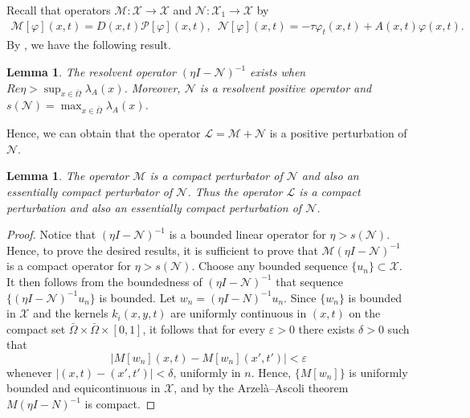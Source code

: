 \documentclass[11pt,reqno]{amsart}
\newtheorem{lemma}[theorem]{Lemma}
\numberwithin{equation}{section}
\begin{document}
Recall that operators
$\mathcal{M}: \mathcal{X}\to \mathcal{X}$ and $\mathcal{N} : \mathcal{X}_{1} \to \mathcal{X}$ by
\begin{align*}
\mathcal{M}[\varphi](x,t)= D(x,t)\mathcal{P}[\varphi](x,t),
\enspace
\mathcal{N}[\varphi](x,t)= -\tau\varphi_{t}(x,t)+A(x,t)\varphi(x,t).
\end{align*}
By \cite[Proposition 2.9]{Feng}, we have the following result.
\begin{lemma}\label{LEM2.6}
The resolvent operator $(\eta I - \mathcal{N})^{-1}$ exists when $Re \eta > \sup_{x\in\bar{\Omega}} \lambda_{A}(x)$.
Moreover, $\mathcal{N}$ is a resolvent positive operator and
$s(\mathcal{N}) = \max_{x\in\bar{\Omega}} \lambda_{A}(x)$.
\end{lemma}
Hence, we can obtain that
the operator $\mathcal{L} = \mathcal{M} + \mathcal{N}$ is a positive perturbation of $\mathcal{N}$.
\begin{lemma}
The operator $\mathcal{M}$ is a compact perturbator of $\mathcal{N}$ and also an essentially compact perturbator of $\mathcal{N}$.
Thus the operator $\mathcal{L}$ is a compact perturbation and also an essentially compact perturbation of $\mathcal{N}$.
\end{lemma}
\begin{proof}
Notice that $(\eta I - \mathcal{N})^{-1}$ is a bounded linear operator for $\eta > s(\mathcal{N})$.
Hence, to prove the desired results, it is sufficient to prove that $\mathcal{M}(\eta I - \mathcal{N})^{-1}$ is a compact operator for $\eta > s(\mathcal{N})$.
Choose any bounded sequence $\{ u_{n} \} \subset
\mathcal{X}$.
It then follows from the boundedness of $(\eta I - \mathcal{N})^{-1}$ that sequence $\{ (\eta I - \mathcal{N})^{-1}u_{n} \} $ is bounded.
Let $w_n=(\eta I-N)^{-1}u_n$. Since $\{w_n\}$ is bounded in $\mathcal{X}$ and the kernels $k_i(x,y,t)$ are uniformly continuous in $(x,t)$ on the compact set $\bar\Omega\times\bar\Omega\times[0,1]$, it follows that for every $\varepsilon>0$ there exists $\delta>0$ such that
\[
|M[w_n](x,t)-M[w_n](x',t')|<\varepsilon
\]
whenever $|(x,t)-(x',t')|<\delta$, uniformly in $n$. Hence, $\{M[w_n]\}$ is uniformly bounded and equicontinuous in $\mathcal{X}$, and by the Arzel\`a--Ascoli theorem $M(\eta I-N)^{-1}$ is compact.
\end{proof}
\end{document}
